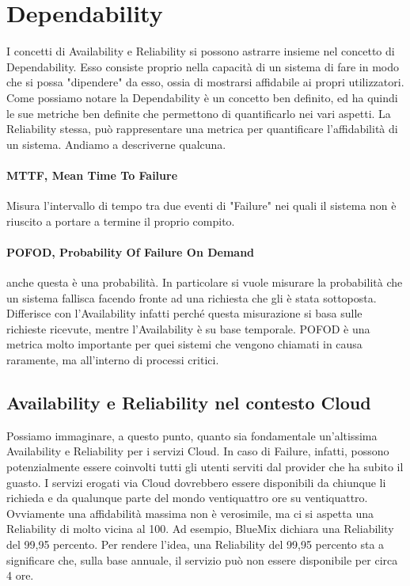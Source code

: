 \section{Dependability}
I concetti di Availability e Reliability si possono astrarre insieme nel concetto di Dependability. Esso consiste proprio nella capacità di un sistema di fare in modo che si possa "dipendere" da esso, ossia di mostrarsi affidabile ai propri utilizzatori. Come possiamo notare la Dependability è un concetto ben definito, ed ha quindi le sue metriche ben definite che permettono di quantificarlo nei vari aspetti. La Reliability stessa, può rappresentare una metrica per quantificare l'affidabilità di un sistema. Andiamo a descriverne qualcuna.


\paragraph{MTTF, Mean Time To Failure}
Misura l'intervallo di tempo tra due eventi di "Failure" nei quali il sistema non è riuscito a portare a termine il proprio compito.

\paragraph{POFOD, Probability Of Failure On Demand} 
anche questa è una probabilità. In particolare si vuole misurare la probabilità che un sistema fallisca facendo fronte ad una richiesta che gli è stata sottoposta. Differisce con l'Availability infatti perché questa misurazione si basa sulle richieste ricevute, mentre l'Availability è su base temporale. POFOD è una metrica molto importante per quei sistemi che vengono chiamati in causa raramente, ma all'interno di processi critici.


\subsection{Availability e Reliability nel contesto Cloud}
Possiamo immaginare, a questo punto, quanto sia fondamentale un'altissima Availability e Reliability per i servizi Cloud. In caso di Failure, infatti, possono potenzialmente essere coinvolti tutti gli utenti serviti dal provider che ha subito il guasto. I servizi erogati via Cloud dovrebbero essere disponibili da chiunque li richieda e da qualunque parte del mondo ventiquattro ore su ventiquattro. Ovviamente una affidabilità massima non è verosimile, ma ci si aspetta una Reliability di molto vicina al 100. Ad esempio, BlueMix dichiara una Reliability del 99,95 percento. Per rendere l'idea, una Reliability del 99,95 percento sta a significare che, sulla base annuale, il servizio può non essere disponibile per circa 4 ore. 

